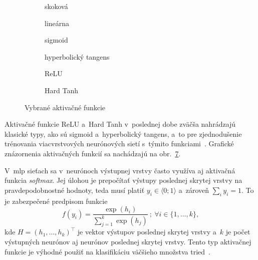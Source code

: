   \begin{figure}[t!]
    \centering
    \begin{subfigure}{0.48\textwidth}
      \centering
      
      \caption{skoková}\label{fig:sgn}
    \end{subfigure}
    \begin{subfigure}{0.48\textwidth}
      \centering
      
      \caption{lineárna}\label{fig:lin}
    \end{subfigure}
    \begin{subfigure}{0.48\textwidth}
      \centering
      
      \caption{sigmoid}\label{fig:sigmoid}
    \end{subfigure}
    \begin{subfigure}{0.48\textwidth}
      \centering
      
      \caption{hyperbolický tangens}\label{fig:tanh}
    \end{subfigure}
    \begin{subfigure}{0.48\textwidth}
      \centering
      
      \caption{ReLU}\label{fig:relu}
    \end{subfigure}
    \begin{subfigure}{0.48\textwidth}
      \centering
      
      \caption{Hard Tanh}\label{fig:htanh}
    \end{subfigure}      
    \caption[Vybrané aktivačné funkcie]{Vybrané aktivačné funkcie}\label{fig:activation}
  \end{figure}

  Aktivačné funkcie ReLU a~Hard Tanh v~poslednej dobe zväčša nahrádzajú klasické typy, ako sú sigmoid a~hyperbolický tangens, a~to pre zjednodušenie trénovania viacvrstvových neurónových sietí s~týmito funkciami~\cite{aggarwalNeuralNetworksDeep2018}. Grafické znázornenia aktivačných funkcií sa nachádzajú na obr.\ \ref{fig:activation}.

  V~\acrshort{mlp} sieťach sa v~neurónoch výstupnej vrstvy často využíva aj aktivačná funkcia \emph{softmax}. Jej úlohou je prepočítať výstupy poslednej skrytej vrstvy na pravdepodobnostné hodnoty, teda musí platiť $y_i \in \langle 0; 1 \rangle$ a~zároveň $\displaystyle\sum_i y_i = 1$. To je zabezpečené predpisom funkcie
  \begin{equation}
    f(y_i) = \frac{\exp (h_i)}{\displaystyle\sum_{j=1}^k \exp (h_j)}\ ;\ \forall i \in \{1,\dots,k\},
  \end{equation}
  kde $H = {(h_1,\dots,h_k)}^{\top}$ je vektor výstupov poslednej skrytej vrstvy a~$k$ je počet výstupných neurónov aj neurónov poslednej skrytej vrstvy. Tento typ aktivačnej funkcie je výhodné použiť na klasifikáciu väčšieho množstva tried~\cite{aggarwalNeuralNetworksDeep2018}.


